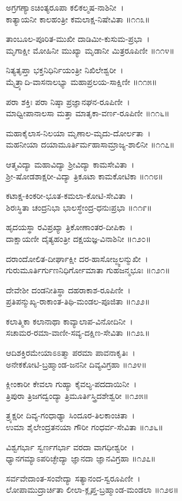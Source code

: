 ಅಗ್ರಗಣ್ಯಾಽಚಿಂತ್ಯರೂಪಾ ಕಲಿಕಲ್ಮಷ-ನಾಶಿನೀ~।\\
ಕಾತ್ಯಾಯನೀ ಕಾಲಹಂತ್ರೀ ಕಮಲಾಕ್ಷ-ನಿಷೇವಿತಾ ॥೧೧೩॥

ತಾಂಬೂಲ-ಪೂರಿತ-ಮುಖೀ ದಾಡಿಮೀ-ಕುಸುಮ-ಪ್ರಭಾ~।\\
ಮೃಗಾಕ್ಷೀ ಮೋಹಿನೀ ಮುಖ್ಯಾ ಮೃಡಾನೀ ಮಿತ್ರರೂಪಿಣೀ ॥೧೧೪॥

ನಿತ್ಯತೃಪ್ತಾ ಭಕ್ತನಿಧಿರ್ನಿಯಂತ್ರೀ ನಿಖಿಲೇಶ್ವರೀ~।\\
ಮೈತ್ರ್ಯಾದಿ-ವಾಸನಾಲಭ್ಯಾ ಮಹಾಪ್ರಲಯ-ಸಾಕ್ಷಿಣೀ ॥೧೧೫॥

ಪರಾ ಶಕ್ತಿಃ ಪರಾ ನಿಷ್ಠಾ ಪ್ರಜ್ಞಾನಘನ-ರೂಪಿಣೀ~।\\
ಮಾಧ್ವೀಪಾನಾಲಸಾ ಮತ್ತಾ ಮಾತೃಕಾ-ವರ್ಣ-ರೂಪಿಣೀ ॥೧೧೬॥

ಮಹಾಕೈಲಾಸ-ನಿಲಯಾ ಮೃಣಾಲ-ಮೃದು-ದೋರ್ಲತಾ~।\\
ಮಹನೀಯಾ ದಯಾಮೂರ್ತಿರ್ಮಹಾಸಾಮ್ರಾಜ್ಯ-ಶಾಲಿನೀ ॥೧೧೭॥

ಆತ್ಮವಿದ್ಯಾ ಮಹಾವಿದ್ಯಾ ಶ್ರೀವಿದ್ಯಾ ಕಾಮಸೇವಿತಾ~।\\
ಶ್ರೀ-ಷೋಡಶಾಕ್ಷರೀ-ವಿದ್ಯಾ ತ್ರಿಕೂಟಾ ಕಾಮಕೋಟಿಕಾ ॥೧೧೮॥

ಕಟಾಕ್ಷ-ಕಿಂಕರೀ-ಭೂತ-ಕಮಲಾ-ಕೋಟಿ-ಸೇವಿತಾ~।\\
ಶಿರಃಸ್ಥಿತಾ ಚಂದ್ರನಿಭಾ ಭಾಲಸ್ಥೇಂದ್ರ-ಧನುಃಪ್ರಭಾ ॥೧೧೯॥

ಹೃದಯಸ್ಥಾ ರವಿಪ್ರಖ್ಯಾ ತ್ರಿಕೋಣಾಂತರ-ದೀಪಿಕಾ~।\\
ದಾಕ್ಷಾಯಣೀ ದೈತ್ಯಹಂತ್ರೀ ದಕ್ಷಯಜ್ಞ-ವಿನಾಶಿನೀ  ॥೧೨೦॥

ದರಾಂದೋಲಿತ-ದೀರ್ಘಾಕ್ಷೀ ದರ-ಹಾಸೋಜ್ಜ್ವಲನ್ಮುಖೀ~।\\
ಗುರುಮೂರ್ತಿರ್ಗುಣನಿಧಿರ್ಗೋಮಾತಾ ಗುಹಜನ್ಮಭೂಃ ॥೧೨೧॥

ದೇವೇಶೀ ದಂಡನೀತಿಸ್ಥಾ ದಹರಾಕಾಶ-ರೂಪಿಣೀ~।\\
ಪ್ರತಿಪನ್ಮುಖ್ಯ-ರಾಕಾಂತ-ತಿಥಿ-ಮಂಡಲ-ಪೂಜಿತಾ ॥೧೨೨॥

ಕಲಾತ್ಮಿಕಾ ಕಲಾನಾಥಾ ಕಾವ್ಯಾಲಾಪ-ವಿನೋದಿನೀ~।\\
ಸಚಾಮರ-ರಮಾ-ವಾಣೀ-ಸವ್ಯ-ದಕ್ಷಿಣ-ಸೇವಿತಾ ॥೧೨೩॥

ಆದಿಶಕ್ತಿರಮೇಯಾಽಽತ್ಮಾ ಪರಮಾ ಪಾವನಾಕೃತಿಃ~।\\
ಅನೇಕಕೋಟಿ-ಬ್ರಹ್ಮಾಂಡ-ಜನನೀ ದಿವ್ಯವಿಗ್ರಹಾ ॥೧೨೪॥

ಕ್ಲೀಂಕಾರೀ ಕೇವಲಾ ಗುಹ್ಯಾ ಕೈವಲ್ಯ-ಪದದಾಯಿನೀ~।\\
ತ್ರಿಪುರಾ ತ್ರಿಜಗದ್ವಂದ್ಯಾ ತ್ರಿಮೂರ್ತಿಸ್ತ್ರಿದಶೇಶ್ವರೀ ॥೧೨೫॥

ತ್ರ್ಯಕ್ಷರೀ ದಿವ್ಯ-ಗಂಧಾಢ್ಯಾ ಸಿಂದೂರ-ತಿಲಕಾಂಚಿತಾ~।\\
ಉಮಾ ಶೈಲೇಂದ್ರತನಯಾ ಗೌರೀ ಗಂಧರ್ವ-ಸೇವಿತಾ ॥೧೨೬॥

ವಿಶ್ವಗರ್ಭಾ ಸ್ವರ್ಣಗರ್ಭಾ ವರದಾ ವಾಗಧೀಶ್ವರೀ~।\\
ಧ್ಯಾನಗಮ್ಯಾಽಪರಿಚ್ಛೇದ್ಯಾ ಜ್ಞಾನದಾ ಜ್ಞಾನವಿಗ್ರಹಾ ॥೧೨೭॥

ಸರ್ವವೇದಾಂತ-ಸಂವೇದ್ಯಾ ಸತ್ಯಾನಂದ-ಸ್ವರೂಪಿಣೀ~।\\
ಲೋಪಾಮುದ್ರಾರ್ಚಿತಾ ಲೀಲಾ-ಕ್ಲೃಪ್ತ-ಬ್ರಹ್ಮಾಂಡ-ಮಂಡಲಾ ॥೧೨೮॥

